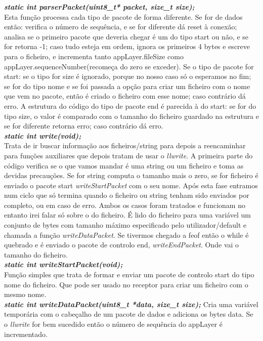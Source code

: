 \documentclass[a4paper]{article}
\begin{document}
\noindent\textbf{\textit{static int parserPacket(uint8\_t* packet, size\_t
size);}}\\ Esta função processa cada tipo de pacote de forma diferente. Se for
de dados então: verifica o número de sequência, e se for diferente dá reset à
conexão; analisa se o primeiro pacote que deveria chegar é um do tipo start ou
não, e se for retorna -1; caso tudo esteja em ordem, ignora os primeiros 4
bytes e escreve para o ficheiro, e incrementa tanto appLayer.fileSize como
appLayer.sequenceNumber(recomeça do zero se exceder). Se o tipo de pacote for start:
se o tipo for size é ignorado, porque no nosso caso só o esperamos no fim;
se for do tipo nome e se foi passada a opção para criar um ficheiro com o
nome que vem no pacote, então é criado o ficheiro com esse nome; caso contrário
dá erro. A estrutura do código do tipo de pacote end é parecida à do start: se
for do tipo size, o valor é comparado com o tamanho do ficheiro guardado na
estrutura e se for diferente retorna erro; caso contrário dá erro.\\

\noindent\textbf{\textit{static int write(void);}}\\ Trata de ir buscar
informação aos ficheiros/string para depois a reencaminhar para funções
auxiliares que depois tratam de usar o \textit{llwrite}. A primeira parte do
código verifica se o que vamos mandar é uma string ou um ficheiro e toma as
devidas precauções. Se for string computa o tamanho mais o zero, se for
ficheiro é enviado o pacote start \textit{writeStartPacket} com o seu nome.
Após esta fase entramos num ciclo que só termina quando o ficheiro ou string
tenham sido enviados por completo, ou em caso de erro. Ambos os casos foram
tratados e funcionam no entanto irei falar só sobre o do ficheiro. É lido do
ficheiro para uma variável um conjunto de bytes com tamanho máximo especificado
pelo utilizador/default e chamada a função \textit{writeDataPacket}. Se
tivermos chegado a feof então o while é quebrado e é enviado o pacote de
controlo end, \textit{writeEndPacket}. Onde vai o tamanho do ficheiro.\\

\noindent\textbf{\textit{static int writeStartPacket(void);}}\\
Função simples que trata de formar e enviar um pacote de controlo start do tipo
nome do ficheiro. Que pode ser usado no receptor para criar um ficheiro com o
mesmo nome.\\

\noindent\textbf{\textit{static int writeDataPacket(uint8\_t *data, size\_t
size);}}
Cria uma variável temporária com o cabeçalho de um pacote de dados e adiciona
os bytes data. Se o \textit{llwrite} for bem sucedido então o número de
sequência do appLayer é incrementado.\\
\end{document}
